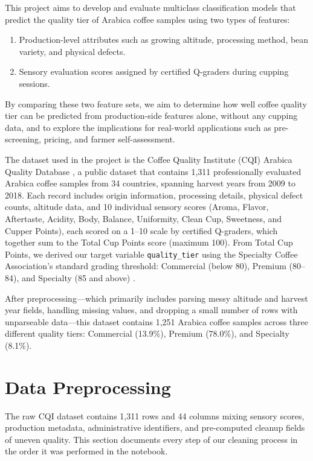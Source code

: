 \documentclass[12pt, a4paper]{article}
\begin{document}
This project aims to develop and evaluate multiclass classification models that predict the quality
tier of Arabica coffee samples using two types of features:
\begin{enumerate}
  \item Production-level attributes such as growing altitude, processing method, bean variety, and
        physical defects.
  \item Sensory evaluation scores assigned by certified Q-graders during cupping sessions.
\end{enumerate}

By comparing these two feature sets, we aim to determine how well coffee quality tier can be
predicted from production-side features alone, without any cupping data, and to explore the
implications for real-world applications such as pre-screening, pricing, and farmer self-assessment.

The dataset used in the project is the Coffee Quality Institute (CQI) Arabica Quality Database
\citep{LeDoux2018}, a public dataset that contains 1,311 professionally evaluated Arabica coffee
samples from 34 countries, spanning harvest years from 2009 to 2018. Each record includes origin
information, processing details, physical defect counts, altitude data, and 10 individual sensory
scores (Aroma, Flavor, Aftertaste, Acidity, Body, Balance, Uniformity, Clean Cup, Sweetness, and
Cupper Points), each scored on a 1--10 scale by certified Q-graders, which together sum to the Total
Cup Points score (maximum 100). From Total Cup Points, we derived our target variable
\texttt{quality\_tier} using the Specialty Coffee Association's standard grading threshold:
Commercial (below 80), Premium (80--84), and Specialty (85 and above) \citep{SCA2005}.

After preprocessing---which primarily includes parsing messy altitude and harvest year fields,
handling missing values, and dropping a small number of rows with unparseable data---this dataset
contains 1,251 Arabica coffee samples across three different quality tiers: Commercial (13.9\%),
Premium (78.0\%), and Specialty (8.1\%).

\section{Data Preprocessing}

The raw CQI dataset contains 1,311 rows and 44 columns mixing sensory scores, production
metadata, administrative identifiers, and pre-computed cleanup fields of uneven quality. This
section documents every step of our cleaning process in the order it was performed in the notebook.
\end{document}

